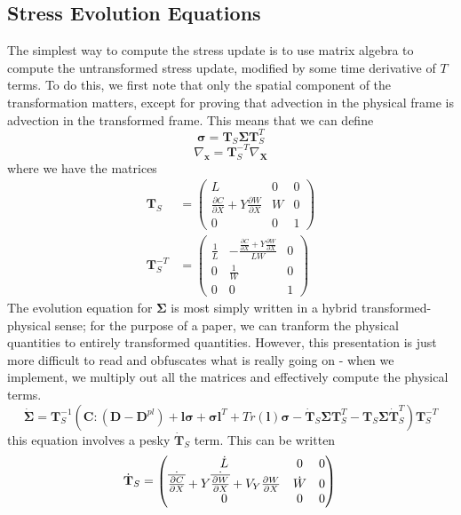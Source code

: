 \documentclass[12pt,a4paper]{article}
\newcommand{\p}{\partial}
\newcommand{\bX}{\mathbf{X}}
\newcommand{\bx}{\mathbf{x}}
\newcommand{\bSig}{\boldsymbol{\Sigma}}
\newcommand{\bsig}{\boldsymbol\sigma}
\newcommand{\bT}{\mathbf{T}}
\newcommand{\bC}{\mathbf{C}}
\newcommand{\bD}{\mathbf{D}}
\newcommand{\bDpl}{\mathbf{D}^{pl}}
\newcommand{\bl}{\mathbf{l}}
\begin{document}
\subsection{Stress Evolution Equations}
The simplest way to compute the stress update is to use matrix algebra to compute the untransformed stress update, modified by some time derivative of $T$ terms. To do this, we first note that only the spatial component of the transformation matters, except for proving that advection in the physical frame is advection in the transformed frame. This means that we can define
\begin{equation}
    \bsig = \bT_S \bSig \bT_S^T
\end{equation}
\begin{equation}
    \nabla_{\bx} = \bT_S^{-T}\nabla_{\bX}
\end{equation}
where we have the matrices
\begin{align}
    \bT_S &= \begin{pmatrix} L & 0 & 0 \\ \frac{\p C}{\p X} + Y \frac{\p W}{\p X} & W & 0 \\ 0 & 0 & 1\end{pmatrix}\\
    \bT_S^{-T} &= \begin{pmatrix} \frac{1}{L} & -\frac{\frac{\p C}{\p X} + Y \frac{\p W}{\p X}}{LW} & 0 \\ 0 & \frac{1}{W} & 0 \\ 0 & 0 & 1 \end{pmatrix}
\end{align}
The evolution equation for $\bSig$ is most simply written in a hybrid transformed-physical sense; for the purpose of a paper, we can tranform the physical quantities to entirely transformed quantities. However, this presentation is just more difficult to read and obfuscates what is really going on - when we implement, we multiply out all the matrices and effectively compute the physical terms.
\begin{equation}
    \dot{\bSig} = \bT_S^{-1}\left(\bC:\left(\bD - \bDpl\right) + \bl \bsig + \bsig \bl^T + Tr(\bl)\bsig - \dot{\bT}_S\bSig\bT_S^T - \bT_S \bSig \dot{\bT}_S^T\right)\bT_S^{-T}
\end{equation}
this equation involves a pesky $\dot{\bT}_S$ term. This can be written
\begin{equation}
    \dot{\bT}_S = \begin{pmatrix} \dot{L} & 0 & 0 \\ \dot{\overline{\frac{\p C}{\p X}}} + Y \dot{\overline{\frac{\p W}{\p X}}} + V_Y\frac{\p W}{\p X} & \dot{W} & 0 \\ 0 & 0 & 0\end{pmatrix}\\
\end{equation}
\end{document}
